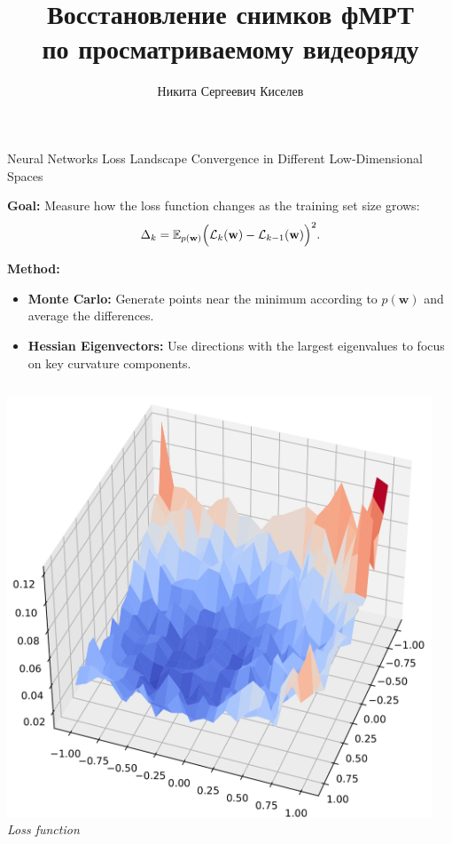 \documentclass[10pt]{beamer}
\title[\hbox to 56mm{Восстановление снимков фМРТ}]{Восстановление снимков фМРТ \\ по просматриваемому видеоряду}
\author[Н.\,С.~Киселев]{Никита Сергеевич Киселев}
\institute{Московский физико-технический институт}
\date{\footnotesize
\par\smallskip\emph{Курс:} Автоматизация научных исследований\par/Группа 003
\par\smallskip\emph{Эксперт:} А.\,В.~Грабовой
\par\bigskip\small 2023}
\begin{document}
\begin{frame}{Neural Networks Loss Landscape Convergence in Different Low-Dimensional Spaces}

\textbf{Goal:} Measure how the loss function changes as the training set size grows:
\[
\Delta_k = \mathbb{E}_{p(\mathbf{w})}\Bigl(\mathcal{L}_{k}(\mathbf{w}) - \mathcal{L}_{k-1}(\mathbf{w})\Bigr)^2.
\]

\textbf{Method:}
\begin{itemize}
    \item \textbf{Monte Carlo:} Generate points near the minimum according to $p(\mathbf{w})$ and average the differences.
    \item \textbf{Hessian Eigenvectors:} Use directions with the largest eigenvalues to focus on key curvature components.
\end{itemize}

\begin{columns}[t]
    \centering
    \hspace*{-2cm}
    \includegraphics[width=0.95\textwidth]{img/LS_16.jpg}\\
    \hspace*{-2cm}
    \scriptsize \textit{Loss function}


\end{columns}
\end{frame}
\end{document}
